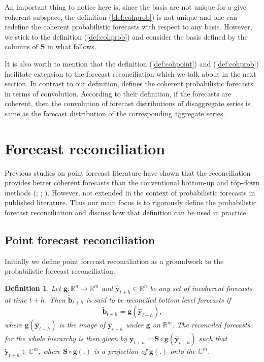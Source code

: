 \documentclass[a4paper, 11pt]{article}
\newtheorem{definition}{Definition}[section]
\begin{document}
An important thing to notice here is, since the basis are not unique for a give coherent subspace, the definition (\ref{def:cohprob}) is not unique and one can redefine the coherent probabilistic forecasts with respect to any basis. However, we stick to the definition (\ref{def:cohprob}) and consider the basis defined by the columns of $\bm{S}$ in what follows.

It is also worth to mention that the definition (\ref{def:cohpoint}) and (\ref{def:cohprob}) facilitate extension to the forecast reconciliation which we talk about in the next section. In contrast to our definition, \citet{BenTaieb2017} defines the coherent probabilistic forecasts in terms of convolution. According to their definition, if the forecasts are coherent, then the convolution of forecast distributions of disaggregate series is same as the forecast distribution of the corresponding aggregate series.  

\section{Forecast reconciliation}\label{sec:reconciliation}

Previous studies on point forecast literature have shown that the reconciliation provides better coherent forecasts than the conventional bottom-up and top-down methods (\cite{Hyndman2011}; \cite{VanErven2015a}; \cite{Wickramasuriya2017}). However, not extended in the context of probabilistic forecasts in published literature. Thus our main focus is to rigorously define the probabilistic forecast reconciliation and discuss how that definition can be used in practice.  

\subsection{Point forecast reconciliation}

Initially we define point forecast reconciliation as a groundwork to the probabilistic forecast reconciliation. 

\begin{definition}\label{def:reconpoint}
	Let $\bm{g}:\bm{\mathbb{R}}^n \rightarrow \bm{\mathbb{R}}^m $ and $\hat{\bm{y}}_{t+h} \in \bm{\mathbb{R}}^n$ be any set of incoherent forecasts at time $t+h$. Then $\tilde{\bm{b}}_{t+h}$ is said to be reconciled bottom level forecasts if 
	\begin{equation}
	\tilde{\bm{b}}_{t+h}=\bm{g}(\hat{\bm{y}}_{t+h}),
	\end{equation}
	where $\bm{g}(\hat{\bm{y}}_{t+h})$ is the image of $\hat{\bm{y}}_{t+h}$ under $\bm{g}$ on $\bm{\mathbb{R}}^m$. The reconciled forecasts for the whole hierarchy is then given by $\tilde{\bm{y}}_{t+h}=\bm{S} \circ \bm{g}(\hat{\bm{y}}_{t+h})$ such that $\tilde{\bm{y}}_{t+h} \in \bm{\mathbb{C}}^m$, where $\bm{S}\circ \bm{g}(.)$ is a projection of $\bm{g}(.)$ onto the $\bm{\mathbb{C}}^m$.
\end{definition}
\end{document}
